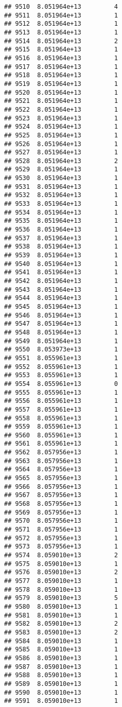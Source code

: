\documentclass[
]{article}
\begin{document}
\begin{verbatim}
## 9510  8.051964e+13         4
## 9511  8.051964e+13         1
## 9512  8.051964e+13         1
## 9513  8.051964e+13         1
## 9514  8.051964e+13         2
## 9515  8.051964e+13         1
## 9516  8.051964e+13         1
## 9517  8.051964e+13         1
## 9518  8.051964e+13         1
## 9519  8.051964e+13         1
## 9520  8.051964e+13         1
## 9521  8.051964e+13         1
## 9522  8.051964e+13         1
## 9523  8.051964e+13         1
## 9524  8.051964e+13         1
## 9525  8.051964e+13         1
## 9526  8.051964e+13         1
## 9527  8.051964e+13         1
## 9528  8.051964e+13         2
## 9529  8.051964e+13         1
## 9530  8.051964e+13         1
## 9531  8.051964e+13         1
## 9532  8.051964e+13         1
## 9533  8.051964e+13         1
## 9534  8.051964e+13         1
## 9535  8.051964e+13         1
## 9536  8.051964e+13         1
## 9537  8.051964e+13         1
## 9538  8.051964e+13         1
## 9539  8.051964e+13         1
## 9540  8.051964e+13         1
## 9541  8.051964e+13         1
## 9542  8.051964e+13         1
## 9543  8.051964e+13         1
## 9544  8.051964e+13         1
## 9545  8.051964e+13         1
## 9546  8.051964e+13         1
## 9547  8.051964e+13         1
## 9548  8.051964e+13         1
## 9549  8.051964e+13         1
## 9550  8.053973e+13         1
## 9551  8.055961e+13         1
## 9552  8.055961e+13         1
## 9553  8.055961e+13         1
## 9554  8.055961e+13         0
## 9555  8.055961e+13         1
## 9556  8.055961e+13         1
## 9557  8.055961e+13         1
## 9558  8.055961e+13         1
## 9559  8.055961e+13         1
## 9560  8.055961e+13         1
## 9561  8.055961e+13         1
## 9562  8.057956e+13         1
## 9563  8.057956e+13         1
## 9564  8.057956e+13         1
## 9565  8.057956e+13         1
## 9566  8.057956e+13         1
## 9567  8.057956e+13         1
## 9568  8.057956e+13         1
## 9569  8.057956e+13         1
## 9570  8.057956e+13         1
## 9571  8.057956e+13         1
## 9572  8.057956e+13         1
## 9573  8.057956e+13         1
## 9574  8.059010e+13         2
## 9575  8.059010e+13         1
## 9576  8.059010e+13         2
## 9577  8.059010e+13         1
## 9578  8.059010e+13         1
## 9579  8.059010e+13         5
## 9580  8.059010e+13         1
## 9581  8.059010e+13         1
## 9582  8.059010e+13         2
## 9583  8.059010e+13         2
## 9584  8.059010e+13         1
## 9585  8.059010e+13         1
## 9586  8.059010e+13         1
## 9587  8.059010e+13         1
## 9588  8.059010e+13         1
## 9589  8.059010e+13         1
## 9590  8.059010e+13         1
## 9591  8.059010e+13         1

\end{verbatim}
\end{document}
